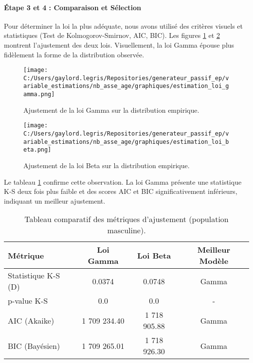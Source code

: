 \paragraph{Étape 3 et 4 : Comparaison et Sélection}
Pour déterminer la loi la plus adéquate, nous avons utilisé des critères visuels et statistiques (Test de Kolmogorov-Smirnov, AIC, BIC). Les figures \ref{fig:gamma} et \ref{fig:beta} montrent l'ajustement des deux lois. Visuellement, la loi Gamma épouse plus fidèlement la forme de la distribution observée.

\begin{figure}[H]
\centering
\texttt{[image: C:/Users/gaylord.legris/Repositories/generateur\_passif\_ep/variable\_estimations/nb\_asse\_age/graphiques/estimation\_loi\_gamma.png]}
\caption{Ajustement de la loi Gamma sur la distribution empirique.}
\label{fig:gamma}
\end{figure}

\begin{figure}[H]
\centering
\texttt{[image: C:/Users/gaylord.legris/Repositories/generateur\_passif\_ep/variable\_estimations/nb\_asse\_age/graphiques/estimation\_loi\_beta.png]}
\caption{Ajustement de la loi Beta sur la distribution empirique.}
\label{fig:beta}
\end{figure}

Le tableau \ref{tab:stats} confirme cette observation. La loi Gamma présente une statistique K-S deux fois plus faible et des scores AIC et BIC significativement inférieurs, indiquant un meilleur ajustement.

\begin{table}[H]
\centering
\begin{tabular}{@{}lccc@{}}
\toprule
\textbf{Métrique} & \textbf{Loi Gamma} & \textbf{Loi Beta} & \textbf{Meilleur Modèle} \\
\midrule
Statistique K-S (D) & 0.0374 & 0.0748 & Gamma \\
p-value K-S & 0.0 & 0.0 & - \\
AIC (Akaike) & 1 709 234.40 & 1 718 905.88 & Gamma \\
BIC (Bayésien) & 1 709 265.01 & 1 718 926.30 & Gamma \\
\bottomrule
\end{tabular}
\caption{Tableau comparatif des métriques d'ajustement (population masculine).}
\label{tab:stats}
\end{table}

